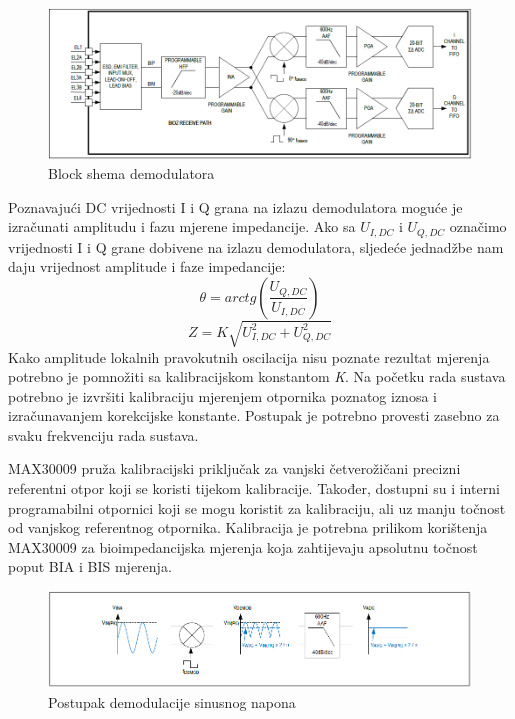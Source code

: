 \documentclass[../diplomski_rad.tex]{subfiles}
\begin{document}
\begin{figure}[htb]
    \centering
    \includegraphics[width=1\textwidth]{Figures/max30009_receive.png} 
    \caption{Block shema demodulatora \cite{max30009_datasheet}}
    \label{slk:max30009_receive}
\end{figure}

Poznavajući DC vrijednosti I i Q grana na izlazu demodulatora moguće je izračunati amplitudu i fazu mjerene impedancije.
Ako sa $U_{I,DC}$ i $U_{Q,DC}$ označimo vrijednosti I i Q grane dobivene na izlazu demodulatora, 
sljedeće jednadžbe nam daju vrijednost amplitude i faze impedancije:
\begin{equation}
    \label{jed:cpe}
    \theta = arctg(\frac{U_{Q,DC}}{U_{I,DC}})
\end{equation} 
\begin{equation}
    \label{jed:cpe}
    Z = K\sqrt{U_{I,DC}^2+U_{Q,DC}^2}
\end{equation} 
Kako amplitude lokalnih pravokutnih oscilacija nisu poznate rezultat mjerenja potrebno je pomnožiti sa kalibracijskom 
konstantom \textit{K}. Na početku rada sustava potrebno je izvršiti kalibraciju mjerenjem otpornika poznatog iznosa i 
izračunavanjem korekcijske konstante. Postupak je potrebno provesti zasebno za svaku frekvenciju rada sustava.

MAX30009 pruža kalibracijski priključak za vanjski četverožičani precizni referentni otpor koji se koristi tijekom kalibracije. 
Također, dostupni su i interni programabilni otpornici koji se mogu koristit za kalibraciju, ali uz manju točnost od vanjskog referentnog otpornika.
Kalibracija je potrebna prilikom korištenja MAX30009 za bioimpedancijska mjerenja koja zahtijevaju apsolutnu točnost poput BIA i BIS mjerenja.

\begin{figure}[htb]
    \centering
    \includegraphics[width=1\textwidth]{Figures/max30009_demodulator.png} 
    \caption{Postupak demodulacije sinusnog napona \cite{max30009_datasheet}}
    \label{slk:max30009_demodulator}
\end{figure}
\end{document}
